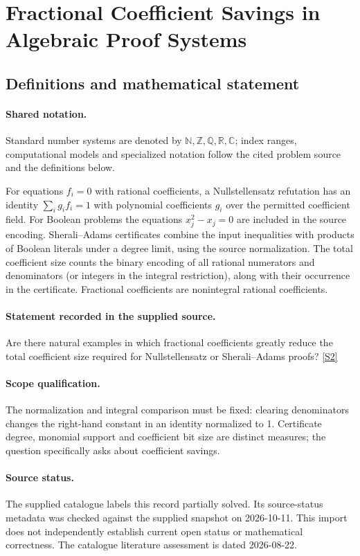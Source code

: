 \documentclass[11pt]{article}
\newcommand{\sref}[2]{\hyperlink{source:#1:#2}{[S#2]}}
\begin{document}
\section{Fractional Coefficient Savings in Algebraic Proof Systems}\label{statement}

\subsection{Definitions and mathematical statement}

\paragraph{Shared notation.}Standard number systems are denoted by $\mathbb N,\mathbb Z,\mathbb Q,\mathbb R,\mathbb C$; index ranges, computational models and specialized notation follow the cited problem source and the definitions below.


For equations $f_i=0$ with rational coefficients, a Nullstellensatz refutation has an identity $\sum_i g_i f_i=1$ with polynomial coefficients $g_i$ over the permitted coefficient field. For Boolean problems the equations $x_j^2-x_j=0$ are included in the source encoding. Sherali--Adams certificates combine the input inequalities with products of Boolean literals under a degree limit, using the source normalization. The total coefficient size counts the binary encoding of all rational numerators and denominators (or integers in the integral restriction), along with their occurrence in the certificate. Fractional coefficients are nonintegral rational coefficients.
\paragraph{Statement recorded in the supplied source.}
Are there natural examples in which fractional coefficients greatly reduce the total coefficient size required for Nullstellensatz or Sherali–Adams proofs? \sref{statement}{2}
\paragraph{Scope qualification.}
The normalization and integral comparison must be fixed: clearing denominators changes the right-hand constant in an identity normalized to 1. Certificate degree, monomial support and coefficient bit size are distinct measures; the question specifically asks about coefficient savings.
\paragraph{Source status.}
The supplied catalogue labels this record partially solved. Its source-status metadata was checked against the supplied snapshot on 2026-10-11. This import does not independently establish current open status or mathematical correctness. The catalogue literature assessment is dated 2026-08-22.
\end{document}
